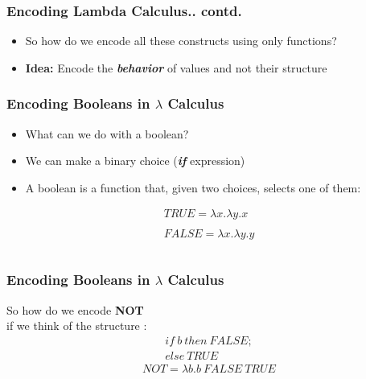 \documentclass{beamer}
\begin{document}
\begin{frame}
\frametitle{Encoding Lambda Calculus.. contd. }
\begin{itemize}
    \item So how do we encode all these
    constructs using only functions?
    \pause
    \item \textbf{Idea:}  Encode the \textbf{\textit{behavior}} of values
and not their structure
\end{itemize}
\end{frame}

\begin{frame}
    \frametitle{Encoding Booleans in $\lambda$ Calculus }
    \begin{itemize}
    \item What can we do with a boolean?
    \item We can make a binary choice (\textbf{\textit{if}}  expression)
    \item A boolean is a function that, given two choices, selects one of them:
    \end{itemize}
    \begin{eqnarray*}
        TRUE = \lambda x . \lambda y.  x \\ \\
        FALSE = \lambda x . \lambda y.  y \\ \\
    \end{eqnarray*}

\end{frame}

\begin{frame}
    \frametitle{Encoding Booleans in $\lambda$ Calculus }
 So how do we encode \textbf{NOT} \\  
 \vspace{1cm}
 if we think of the structure :  \\
 \pause
 \begin{eqnarray*}
    if\  b \ then \ FALSE; \\
    else \  TRUE 
\end{eqnarray*}
 \pause
 \begin{eqnarray*}
NOT = \lambda b . b\  FALSE\  TRUE 
\end{eqnarray*}
\end{frame}
\end{document}
